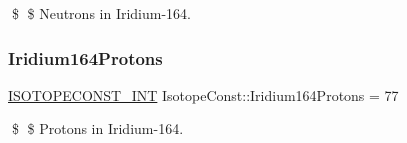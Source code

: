 \$ \$ Neutrons in Iridium-\/164. \mbox{\label{group___isotope_const-_iridium-_ir164_gafe1b4886f3cfb6f678c6bd303f2ae60a}} 
\subsubsection{\texorpdfstring{Iridium164\+Protons}{Iridium164Protons}}
{\footnotesize\ttfamily \mbox{\hyperlink{group___isotope_const-_macros_ga5f18360b3e99483a35c32d789e62621c}{I\+S\+O\+T\+O\+P\+E\+C\+O\+N\+S\+T\+\_\+\+I\+NT}} Isotope\+Const\+::\+Iridium164\+Protons = 77}

\$ \$ Protons in Iridium-\/164. 
